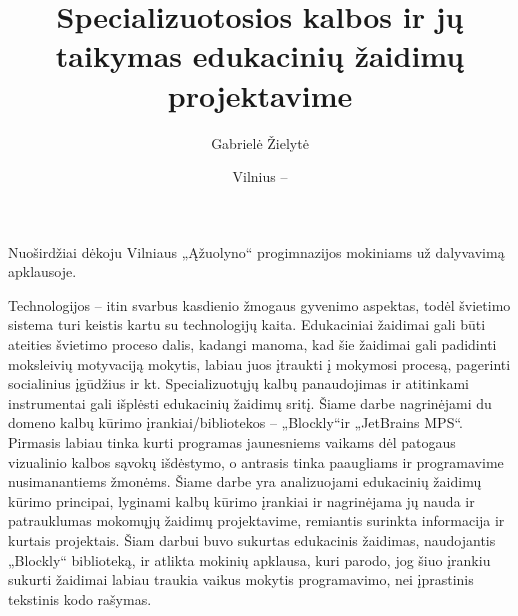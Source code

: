 \documentclass{VUMIFPSkursinis}
\institute{Informatikos institutas}  %
\title{Specializuotosios kalbos ir jų taikymas edukacinių žaidimų projektavime}
\author{Gabrielė Žielytė}
\date{Vilnius – \the\year}
\begin{document}
\maketitle

\sectionnonumnocontent{}
\setcounter{page}{1}
\vspace{7cm}
\begin{center}
    Nuoširdžiai dėkoju Vilniaus „Ąžuolyno“ progimnazijos mokiniams už dalyvavimą apklausoje.
\end{center}

Technologijos -- itin svarbus kasdienio žmogaus gyvenimo aspektas, todėl švietimo sistema turi keistis kartu su technologijų kaita. Edukaciniai žaidimai gali būti ateities švietimo proceso dalis, kadangi manoma, kad šie žaidimai gali padidinti moksleivių motyvaciją mokytis, labiau juos įtraukti į mokymosi procesą, pagerinti socialinius įgūdžius ir kt. Specializuotųjų kalbų panaudojimas ir atitinkami instrumentai gali išplėsti edukacinių žaidimų sritį. Šiame darbe nagrinėjami du domeno kalbų kūrimo įrankiai/bibliotekos -- „Blockly“ir „JetBrains MPS“. Pirmasis labiau tinka kurti programas jaunesniems vaikams dėl patogaus vizualinio kalbos sąvokų išdėstymo, o antrasis tinka paaugliams ir programavime nusimanantiems žmonėms. Šiame darbe yra analizuojami edukacinių žaidimų kūrimo principai, lyginami kalbų kūrimo įrankiai ir nagrinėjama jų nauda ir patrauklumas mokomųjų žaidimų projektavime, remiantis surinkta informacija ir kurtais projektais. Šiam darbui buvo sukurtas edukacinis žaidimas, naudojantis „Blockly“ biblioteką, ir atlikta mokinių apklausa, kuri parodo, jog šiuo įrankiu sukurti žaidimai labiau traukia vaikus mokytis programavimo, nei įprastinis tekstinis kodo rašymas.

\end{document}
